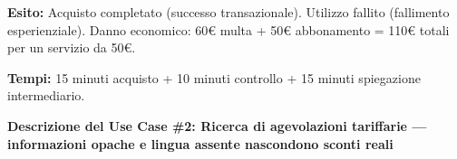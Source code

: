 ﻿\documentclass[11pt,a4paper]{article}
\begin{document}
\begin{tcolorbox}[base]
{    \textbf{Esito:} Acquisto completato (successo transazionale). Utilizzo fallito (fallimento esperienziale). Danno economico: 60\euro{} multa + 50\euro{} abbonamento = 110\euro{} totali per un servizio da 50\euro{}.

    \textbf{Tempi:} 15 minuti acquisto + 10 minuti controllo + 15 minuti spiegazione intermediario.
    }
\end{tcolorbox}

\vspace{0.3cm}


\begin{tcolorbox}[sectionbox,colback=primaryColor!10]
    \textbf{Descrizione del Use Case \#2: Ricerca di agevolazioni tariffarie --- informazioni opache e lingua assente nascondono sconti reali}
\end{tcolorbox}

\vspace{0.3cm}
\end{document}
